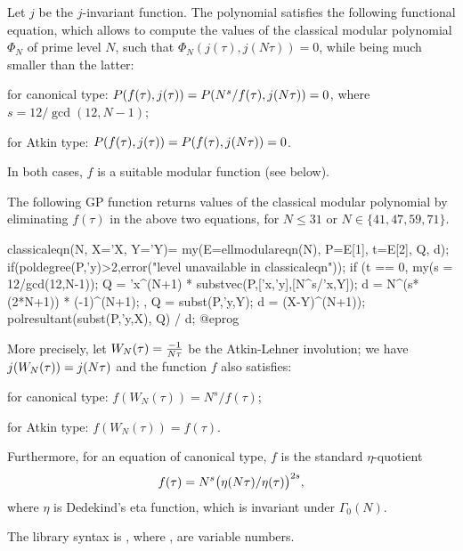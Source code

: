 Let $j$ be the $j$-invariant function. The polynomial  satisfies
the following functional equation, which allows to compute the values of the
classical modular polynomial $\Phi_N$ of prime level $N$, such that
$\Phi_N(j(\tau), j(N\tau)) = 0$, while being much smaller than the latter:

\item for canonical type:
 $P(f(\tau),j(\tau)) = P(N^s/f(\tau),j(N\*\tau)) = 0$,
 where $s = 12/\gcd(12,N-1)$;

\item for Atkin type:
 $P(f(\tau),j(\tau)) = P(f(\tau),j(N\*\tau)) = 0$.

\noindent In both cases, $f$ is a suitable modular function (see below).

The following GP function returns values of the classical modular polynomial
by eliminating $f(\tau)$ in the above two equations, for $N\leq 31$ or
$N\in\{41,47,59,71\}$.

\bprog
classicaleqn(N, X='X, Y='Y)=
{
  my(E=ellmodulareqn(N), P=E[1], t=E[2], Q, d);
  if(poldegree(P,'y)>2,error("level unavailable in classicaleqn"));
  if (t == 0,
    my(s = 12/gcd(12,N-1));
    Q = 'x^(N+1) * substvec(P,['x,'y],[N^s/'x,Y]);
    d = N^(s*(2*N+1)) * (-1)^(N+1);
  ,
    Q = subst(P,'y,Y);
    d = (X-Y)^(N+1));
  polresultant(subst(P,'y,X), Q) / d;
}
@eprog

More precisely, let $W_N(\tau)={{-1}\over{N\*\tau}}$ be the Atkin-Lehner
involution; we have $j(W_N(\tau)) = j(N\*\tau)$ and the function $f$ also
satisfies:

\item for canonical type:
   $f(W_N(\tau)) = N^s/f(\tau)$;

\item for Atkin type:
   $f(W_N(\tau)) = f(\tau)$.

\noindent Furthermore, for an equation of canonical type, $f$ is the standard
$\eta$-quotient
$$f(\tau) = N^s \* \big(\eta(N\*\tau) / \eta(\tau) \big)^{2\*s},$$
where $\eta$ is Dedekind's eta function, which is invariant under
$\Gamma_0(N)$.

The library syntax is , where ,  are variable numbers.

